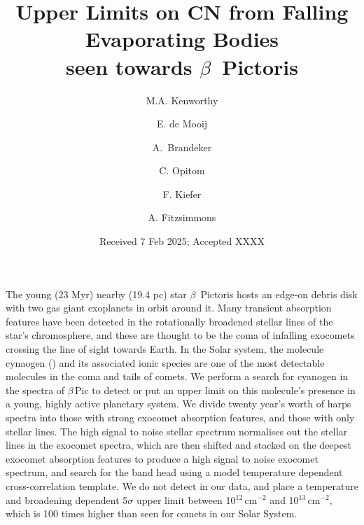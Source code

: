 \documentclass{aa}
\newcommand{\bp}{$\beta$\,Pic}
\begin{document}
 


   \title{Upper Limits on CN from Falling Evaporating Bodies\\seen towards $\beta$~Pictoris}

   \author{M.A. Kenworthy
          \and
          E. de Mooij
          \and
          A.\ Brandeker
          \and 
         C. Opitom
          \and
          F. Kiefer
          \and
          A. Fitzsimmons 
          }


   \date{Received 7 Feb 2025; Accepted XXXX}

 
  \abstract
   {The young (23 Myr) nearby (19.4 pc) star $\beta$~Pictoris hosts an edge-on debris disk with two gas giant exoplanets in orbit around it.
   Many transient absorption features have been detected in the rotationally broadened stellar lines of the star's chromosphere, and these are thought to be the coma of infalling exocomets crossing the line of sight towards Earth.
}
   {In the Solar system, the molecule cynaogen () and its associated ionic species are one of the most detectable molecules in the coma and tails of comets.
   We perform a search for cyanogen in the spectra of \bp{} to detect or put an upper limit on this molecule's presence in a young, highly active planetary system.}
   {We divide twenty year's worth of \ac{harps} spectra into those with strong exocomet absorption features, and those with only stellar lines.
   The high signal to noise stellar spectrum normalises out the stellar lines in the exocomet spectra, which are then shifted and stacked on the deepest exocomet absorption features to produce a high signal to noise exocomet spectrum, and search for the  band head using a model temperature dependent cross-correlation template.
   }
   {We do not detect  in our data, and place a temperature and broadening dependent 5$\sigma$ upper limit between 10$^{12}$\,cm$^{-2}$ and 10$^{13}$\,cm$^{-2}$, which is 100 times higher than seen for comets in our Solar System.
   }
\end{document}
